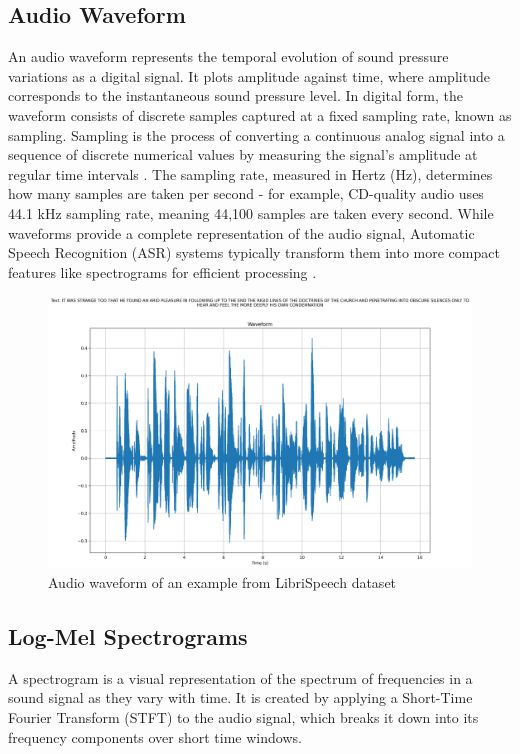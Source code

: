 \documentclass[../report.tex]{subfiles}
\begin{document}
    \subsection{Audio Waveform}
    An audio waveform represents the temporal evolution of sound pressure variations as a digital signal. It plots amplitude against time, where amplitude corresponds to the instantaneous sound pressure level. In digital form, the waveform consists of discrete samples captured at a fixed sampling rate, known as sampling. Sampling is the process of converting a continuous analog signal into a sequence of discrete numerical values by measuring the signal's amplitude at regular time intervals \cite{symons2013digital}. The sampling rate, measured in Hertz (Hz), determines how many samples are taken per second - for example, CD-quality audio uses 44.1 kHz sampling rate, meaning 44,100 samples are taken every second. While waveforms provide a complete representation of the audio signal, Automatic Speech Recognition (ASR) systems typically transform them into more compact features like spectrograms for efficient processing \cite{rabiner2007introduction}.
    \begin{figure}[ht]
        \centering
        \includegraphics[width=0.8\linewidth]{../figures/waveform.png}
        \caption{Audio waveform of an example from LibriSpeech dataset}
        \label{fig:audio_waveform}
    \end{figure}
    
    \subsection{Log-Mel Spectrograms}
    A spectrogram is a visual representation of the spectrum of frequencies in a sound signal as they vary with time. It is created by applying a Short-Time Fourier Transform (STFT) to the audio signal, which breaks it down into its frequency components over short time windows.
\end{document}
